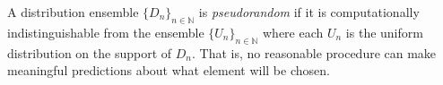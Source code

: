 \documentclass[12pt]{article}
\begin{document}
A distribution ensemble $\{D_n\}_{n\in\mathbb{N}}$ is \emph{pseudorandom} if it is computationally indistinguishable from the ensemble $\{U_n\}_{n\in\mathbb{N}}$ where each $U_n$ is the uniform distribution on the support of $D_n$.  That is, no reasonable procedure can make meaningful predictions about what element will be chosen.
\end{document}
